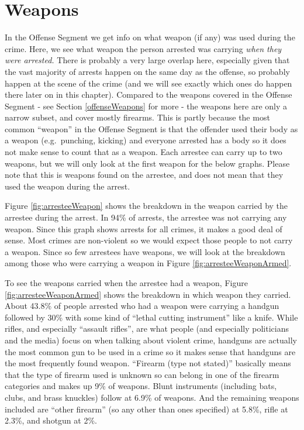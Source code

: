 \documentclass[
]{krantz}
\begin{document}
\section{Weapons}\label{weapons}

In the Offense Segment we get info on what weapon (if any)
was used during the crime. Here, we see what weapon the
person arrested was carrying \emph{when they were arrested.}
There is probably a very large overlap here, especially
given that the vast majority of arrests happen on the same
day as the offense, so probably happen at the scene of the
crime (and we will see exactly which ones do happen there
later on in this chapter). Compared to the weapons covered
in the Offense Segment - see Section \ref{offenseWeapons}
for more - the weapons here are only a narrow subset, and
cover mostly firearms. This is partly because the most
common ``weapon'' in the Offense Segment is that the
offender used their body as a weapon (e.g.~punching,
kicking) and everyone arrested has a body so it does not
make sense to count that as a weapon. Each arrestee can
carry up to two weapons, but we will only look at the first
weapon for the below graphs. Please note that this is
weapons found on the arrestee, and does not mean that they
used the weapon during the arrest.

Figure \ref{fig:arresteeWeapon} shows the breakdown in the
weapon carried by the arrestee during the arrest. In 94\% of
arrests, the arrestee was not carrying any weapon. Since
this graph shows arrests for all crimes, it makes a good
deal of sense. Most crimes are non-violent so we would
expect those people to not carry a weapon. Since so few
arrestees have weapons, we will look at the breakdown among
those who were carrying a weapon in Figure
\ref{fig:arresteeWeaponArmed}.

To see the weapons carried when the arrestee had a weapon,
Figure \ref{fig:arresteeWeaponArmed} shows the breakdown in
which weapon they carried. About 43.8\% of people arrested
who had a weapon were carrying a handgun followed by 30\%
with some kind of ``lethal cutting instrument'' like a
knife. While rifles, and especially ``assault rifles'', are
what people (and especially politicians and the media) focus
on when talking about violent crime, handguns are actually
the most common gun to be used in a crime so it makes sense
that handguns are the most frequently found weapon.
``Firearm (type not stated)'' basically means that the type
of firearm used is unknown so can belong in one of the
firearm categories and makes up 9\% of weapons. Blunt
instruments (including bats, clubs, and brass knuckles)
follow at 6.9\% of weapons. And the remaining weapons
included are ``other firearm'' (so any other than ones
specified) at 5.8\%, rifle at 2.3\%, and shotgun at 2\%.
\end{document}
